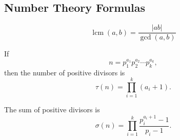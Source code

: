 \subsection{Number Theory Formulas}

\[
\operatorname{lcm}(a,b)
=
\frac{|ab|}{\gcd(a,b)}
\]

If
\[
n=p_1^{a_1}p_2^{a_2}\cdots p_k^{a_k},
\]
then the number of positive divisors is
\[
\tau(n)=\prod_{i=1}^{k}(a_i+1).
\]

The sum of positive divisors is
\[
\sigma(n)
=
\prod_{i=1}^{k}
\frac{p_i^{a_i+1}-1}{p_i-1}.
\]
